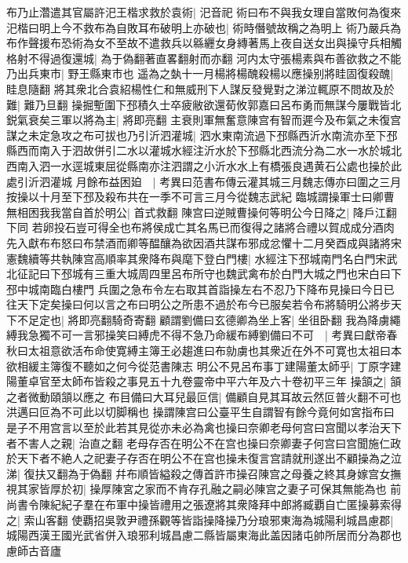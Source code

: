 布乃止濳遣其官屬許汜王楷求救於袁術|{
	汜音祀}
術曰布不與我女理自當敗何為復來汜楷曰明上今不救布為自敗耳布破明上亦破也|{
	術時僭號故稱之為明上}
術乃嚴兵為布作聲援布恐術為女不至故不遣救兵以緜纒女身縳著馬上夜自送女出與操守兵相觸格射不得過復還城|{
	為于偽翻著直畧翻射而亦翻}
河内太守張楊素與布善欲救之不能乃出兵東市|{
	野王縣東市也}
遥為之埶十一月楊將楊醜殺楊以應操别將眭固復殺醜|{
	眭息隨翻}
將其衆北合袁紹楊性仁和無威刑下人謀反發覺對之涕泣輒原不問故及於難|{
	難乃旦翻}
操掘塹圍下邳積久士卒疲敝欲還荀攸郭嘉曰呂布勇而無謀今屢戰皆北鋭氣衰矣三軍以將為主|{
	將即亮翻}
主衰則軍無奮意陳宫有智而遲今及布氣之未復宫謀之未定急攻之布可拔也乃引沂泗灌城|{
	泗水東南流過下邳縣西沂水南流亦至下邳縣西而南入于泗故併引二水以灌城水經注沂水於下邳縣北西流分為二水一水於城北西南入泗一水逕城東屈從縣南亦注泗謂之小沂水水上有橋張良遇黄石公處也操於此處引沂泗灌城}
月餘布益困廹　|{
	考異曰范書布傳云灌其城三月魏志傳亦曰圍之三月按操以十月至下邳及殺布共在一季不可言三月今從魏志武紀}
臨城謂操軍士曰卿曹無相困我我當自首於明公|{
	首式救翻}
陳宫曰逆賊曹操何等明公今日降之|{
	降戶江翻下同}
若卵投石豈可得全也布將侯成亡其名馬已而復得之諸將合禮以賀成成分酒肉先入獻布布怒曰布禁酒而卿等醖釀為欲因酒共謀布邪成忿懼十二月癸酉成與諸將宋憲魏續等共執陳宫高順率其衆降布與麾下登白門樓|{
	水經注下邳城南門名白門宋武北征記曰下邳城有三重大城周四里呂布所守也魏武禽布於白門大城之門也宋白曰下邳中城南臨白樓門}
兵圍之急布令左右取其首詣操左右不忍乃下降布見操曰今日已往天下定矣操曰何以言之布曰明公之所患不過於布今已服矣若令布將騎明公將步天下不足定也|{
	將即亮翻騎奇寄翻}
顧謂劉備曰玄德卿為坐上客|{
	坐徂卧翻}
我為降虜繩縛我急獨不可一言邪操笑曰縛虎不得不急乃命緩布縛劉備曰不可　|{
	考異曰獻帝春秋曰太祖意欲活布命使寛縛主簿王必趨進曰布勍虜也其衆近在外不可寛也太祖曰本欲相緩主簿復不聽如之何今從范書陳志}
明公不見呂布事丁建陽董太師乎|{
	丁原字建陽董卓官至太師布皆殺之事見五十九卷靈帝中平六年及六十卷初平三年}
操頷之|{
	頷之者微動頤頷以應之}
布目備曰大耳兒最叵信|{
	備顧自見其耳故云然叵普火翻不可也洪邁曰叵為不可此以切脚稱也}
操謂陳宫曰公臺平生自謂智有餘今竟何如宮指布曰是子不用宫言以至於此若其見從亦未必為禽也操曰奈卿老母何宫曰宫聞以孝治天下者不害人之親|{
	治直之翻}
老母存否在明公不在宫也操曰奈卿妻子何宫曰宫聞施仁政於天下者不絶人之祀妻子存否在明公不在宫也操未復言宫請就刑遂出不顧操為之泣涕|{
	復扶又翻為于偽翻}
幷布順皆縊殺之傳首許市操召陳宫之母養之終其身嫁宫女撫視其家皆厚於初|{
	操厚陳宮之家而不肯存孔融之嗣必陳宫之妻子可保其無能為也}
前尚書令陳紀紀子羣在布軍中操皆禮用之張遼將其衆降拜中郎將臧覇自亡匿操募索得之|{
	索山客翻}
使覇招吳敦尹禮孫觀等皆詣操降操乃分琅邪東海為城陽利城昌慮郡|{
	城陽西漢王國光武省併入琅邪利城昌慮二縣皆屬東海此盖因諸屯帥所居而分為郡也慮師古音廬}
